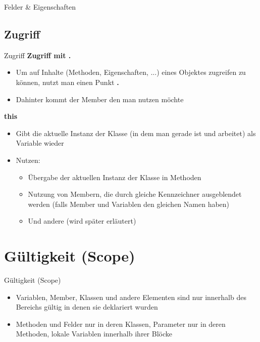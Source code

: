 \begin{frame}{Felder \& Eigenschaften}	
	
\end{frame}

\subsection{Zugriff}
\begin{frame}{Zugriff}
	\textbf{Zugriff mit .}\\
	\begin{itemize}
		\item Um auf Inhalte (Methoden, Eigenschaften, ...) eines Objektes zugreifen zu können, nutzt man einen Punkt \alert{\textbf{.}}
		\item Dahinter kommt der Member den man nutzen möchte
	\end{itemize}
	\textbf{this}\\
	\begin{itemize}
		\item Gibt die aktuelle Instanz der Klasse (in dem man gerade ist und arbeitet) als Variable wieder
		\item Nutzen:
		\begin{itemize}
			\item Übergabe der aktuellen Instanz der Klasse in Methoden
			\item Nutzung von Membern, die durch gleiche Kennzeichner ausgeblendet werden (falls Member und Variablen den gleichen Namen haben)
			\item Und andere (wird später erläutert)
		\end{itemize}
	\end{itemize}
\end{frame}

\section{Gültigkeit (Scope)}
\begin{frame}{Gültigkeit (Scope)}
	\begin{itemize}
		\item Variablen, Member, Klassen und andere Elementen sind nur innerhalb des Bereichs gültig in denen sie deklariert wurden
		\item Methoden und Felder nur in deren Klassen, Parameter nur in deren Methoden, lokale Variablen innerhalb ihrer Blöcke
	\end{itemize}
	
\end{frame}

